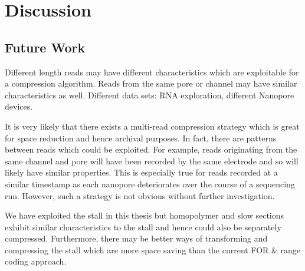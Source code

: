 \chapter{Discussion} \label{chap:disc}

\section{Future Work}

Different length reads may have different characteristics which are exploitable for a compression algorithm.
Reads from the same pore or channel may have similar characteristics as well.
Different data sets:
RNA exploration,
different Nanopore devices.

It is very likely that there exists a multi-read compression strategy which is great for space reduction and hence archival purposes.
In fact, there are patterns between reads which could be exploited.
For example, reads originating from the same channel and pore will have been recorded by the same electrode and so will likely have similar properties. This is especially true for reads recorded at a similar timestamp as each nanopore deteriorates over the course of a sequencing run.
However, such a strategy is not obvious without further investigation.

We have exploited the stall in this thesis but homopolymer and slow sections
exhibit similar characteristics to the stall and hence could also be separately
compressed. Furthermore, there may be better ways of transforming and
compressing the stall which are more space saving than the current FOR \& range
coding approach.

